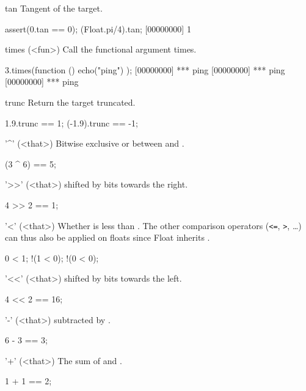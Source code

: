 \begin{urbiscriptapi}
\item[tan]
  Tangent of the target.
\begin{urbiscript}
assert(0.tan == 0);
(Float.pi/4).tan;
[00000000] 1
\end{urbiscript}

\item[times](<fun>)%
  Call the functional argument  \this times.

\begin{urbiscript}
3.times(function () { echo("ping") });
[00000000] *** ping
[00000000] *** ping
[00000000] *** ping
\end{urbiscript}


\item[trunc]
  Return the target truncated.
\begin{urbiassert}
1.9.trunc == 1;  (-1.9).trunc == -1;
\end{urbiassert}

\item['^'](<that>)%
  Bitwise exclusive or between \this and .
\begin{urbiassert}
(3 ^ 6) == 5;
\end{urbiassert}

\item['>>'](<that>)%
  \this shifted by  bits towards the right.
\begin{urbiassert}
4 >> 2 == 1;
\end{urbiassert}

\item['<'](<that>)%
  Whether \this is less than . The other comparison operators
  (\lstinline|<=|, \lstinline|>|, \ldots) can thus also be applied on floats
  since Float inherits .
\begin{urbiassert}
  0 < 1;  !(1 < 0);  !(0 < 0);
\end{urbiassert}

\item['<<'](<that>)%
  \this shifted by  bits towards the left.
\begin{urbiassert}
4 << 2 == 16;
\end{urbiassert}

\item['-'](<that>)%
  \this subtracted by .
\begin{urbiassert}
6 - 3 == 3;
\end{urbiassert}

\item['+'](<that>)%
  The sum of \this and .
\begin{urbiassert}
1 + 1 == 2;
\end{urbiassert}


\end{urbiscriptapi}
